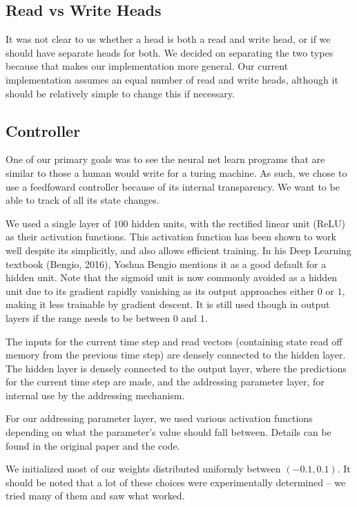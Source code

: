 \documentclass[12pt]{article}
\begin{document}
\subsection{Read vs Write Heads}

It was not clear to us whether a head is both a read and write head, or if we
should have separate heads for both. We decided on separating the two types
because that makes our implementation more general.
Our current implementation assumes an equal number of read and write heads,
although it should be relatively simple to change this if necessary.

\subsection{Controller}

One of our primary goals was to see the neural net learn programs that are
similar to those a human would write for a turing machine. As such, we chose
to use a feedfoward controller because of its internal transparency. We want
to be able to track of all its state changes.

We used a single layer of $100$ hidden units, with the rectified linear unit (ReLU)
as their activation functions. This activation function has been shown to work
well despite its simplicitly, and also allows efficient training.
In his Deep Learning textbook (Bengio, 2016)\cite{Goodfellow-et-al-2016-Book}, Yoshua Bengio
mentions it as a good default for a hidden unit. Note that the sigmoid unit is now
commonly avoided as a hidden unit due to its gradient rapidly vanishing
as its output approaches either $0$ or $1$, making it less trainable by gradient
descent. It is still used though in output layers if the range needs to be between
$0$ and $1$.

The inputs for the current time step and read vectors (containing state read off
memory from the previous time step) are densely connected to the
hidden layer. The hidden layer is densely connected to the output layer, where the
predictions for the current time step are made, and the addressing parameter layer,
for internal use by the addressing mechanism.

For our addressing parameter layer, we used various activation functions depending
on what the parameter's value should fall between. Details can be found in
the original paper and the code.

We initialized most of our weights distributed uniformly between $(-0.1, 0.1)$.
It should be noted that a lot of these choices were experimentally determined -- we 
tried many of them and saw what worked.
\end{document}
